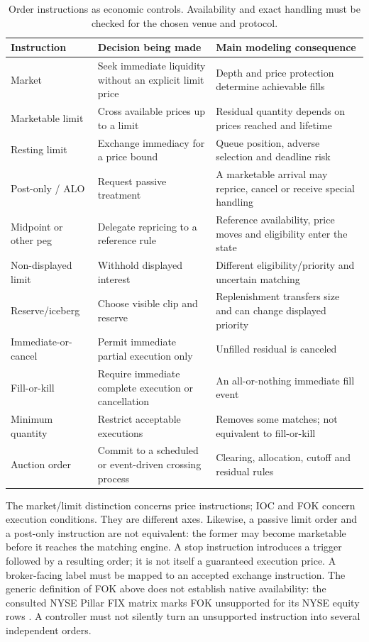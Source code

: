 \documentclass[11pt]{article}
\numberwithin{equation}{section}
\theoremstyle{definition}
\theoremstyle{remark}
\theoremstyle{definition}
\begin{document}
\begin{table}[tb]
\centering\small
\caption{Order instructions as economic controls. Availability and exact handling
must be checked for the chosen venue and protocol.}
\begin{tabularx}{\textwidth}{p{}YY}
\toprule Instruction & Decision being made & Main modeling consequence \\\midrule
Market & Seek immediate liquidity without an explicit limit price & Depth and price protection determine achievable fills \\
Marketable limit & Cross available prices up to a limit & Residual quantity depends on prices reached and lifetime \\
Resting limit & Exchange immediacy for a price bound & Queue position, adverse selection and deadline risk \\
Post-only / ALO & Request passive treatment & A marketable arrival may reprice, cancel or receive special handling \\
Midpoint or other peg & Delegate repricing to a reference rule & Reference availability, price moves and eligibility enter the state \\
Non-displayed limit & Withhold displayed interest & Different eligibility/priority and uncertain matching \\
Reserve/iceberg & Choose visible clip and reserve & Replenishment transfers size and can change displayed priority \\
Immediate-or-cancel & Permit immediate partial execution only & Unfilled residual is canceled \\
Fill-or-kill & Require immediate complete execution or cancellation & An all-or-nothing immediate fill event \\
Minimum quantity & Restrict acceptable executions & Removes some matches; not equivalent to fill-or-kill \\
Auction order & Commit to a scheduled or event-driven crossing process & Clearing, allocation, cutoff and residual rules \\
\bottomrule
\end{tabularx}
\end{table}

The market/limit distinction concerns price instructions; IOC and FOK concern
execution conditions. They are different axes. Likewise, a passive limit order
and a post-only instruction are not equivalent: the former may become marketable
before it reaches the matching engine. A stop instruction introduces a trigger
followed by a resulting order; it is not itself a guaranteed execution price.
A broker-facing label must be mapped to an accepted exchange instruction.
The generic definition of FOK above does not establish native availability: the
consulted NYSE Pillar FIX matrix marks FOK unsupported for its NYSE equity
rows \citep{nyseordermatrix}. A controller must not silently turn an
unsupported instruction into several independent orders.
\end{document}
